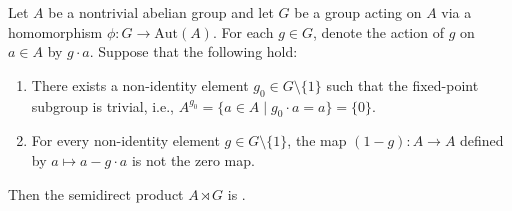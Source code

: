 \begin{theorem}
\label{theorem:semidirect_product_of_an_abelian_group_by_a_group_is_center_free_wheneever_fixed_point_subgroup_by_non_identity_elements_are_trivial_and_1_minus_non_identity_elements_are_non_zero_endomorphisms}
Let $A$ be a nontrivial abelian group and let $G$ be a group acting on $A$ via a homomorphism $\phi: G \to \text{Aut}(A)$. For each $g \in G$, denote the action of $g$ on $a \in A$ by $g \cdot a$. Suppose that the following hold:
\begin{enumerate}
    \item \label{cond:fixed_points_exist} There exists a non-identity element $g_0 \in G \setminus \{1\}$ such that the fixed-point subgroup is trivial, i.e., $A^{g_0} = \{a \in A \mid g_0 \cdot a = a\} = \{0\}$.
    \item \label{cond:image} For every non-identity element $g \in G \setminus \{1\}$, the map $(1 - g): A \to A$ defined by $a \mapsto a - g \cdot a$ is not the zero map.
\end{enumerate}
Then the semidirect product $A \rtimes G$ is .
\end{theorem}

